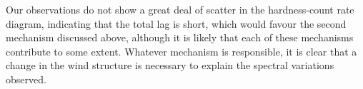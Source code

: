 \documentclass[useAMS,usenatbib]{sam}
\begin{document}
% 

Our observations do not show a great deal of scatter in the hardness-count rate diagram, indicating that the total lag is short, which would favour the second mechanism
discussed above, although it is likely that each of these mechanisms contribute to some extent. Whatever mechanism is responsible, it is clear that a change
in the wind structure is necessary to explain the spectral variations observed.




\end{document}
